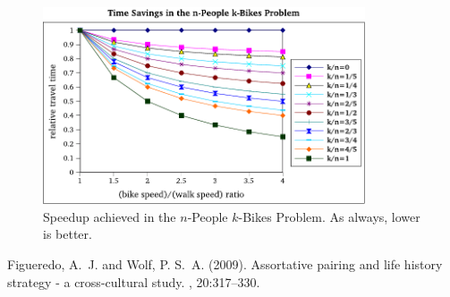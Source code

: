 \documentclass[DIV=calc, paper=a4, fontsize=11pt, twocolumn]{scrartcl}	 %
\newcommand\prob{$n$-People $k$-Bikes Problem}
\begin{document}
\begin{figure}[t]
	\centering
	\includegraphics[width=0.85\textwidth]{graph.pdf}
	\caption{Speedup achieved in the \prob. As always, lower is better.}
	\label{fig:graph}
\end{figure}

\begin{thebibliography}{99} %

Figueredo, A.~J. and Wolf, P. S.~A. (2009).
\newblock Assortative pairing and life history strategy - a cross-cultural
  study.
, 20:317--330.
 
\end{thebibliography}

\end{document}
